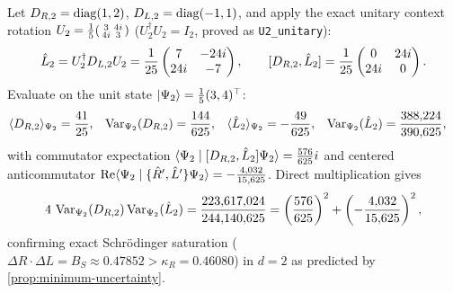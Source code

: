 \begin{example}
\label{ex:uncertainty-2x2}
Let $D_{R,2} = \diag(1, 2)$, $D_{L,2} = \diag(-1, 1)$, and apply the exact unitary context
rotation $U_2 = \frac{1}{5}\begin{psmallmatrix} 3 & 4i \\ 4i & 3 \end{psmallmatrix}$
($U_2^\dagger U_2 = I_2$, proved as \texttt{U2\_unitary}):
\begin{equation*}
  \opL_2 = U_2^\dagger D_{L,2} U_2 =
  \frac{1}{25}\begin{pmatrix} 7 & -24i \\ 24i & -7 \end{pmatrix},
  \qquad
  \comm{D_{R,2}}{\opL_2} =
  \frac{1}{25}\begin{pmatrix} 0 & 24i \\ 24i & 0 \end{pmatrix}.
\end{equation*}
Evaluate on the unit state $\ket{\Psi_2} = \frac{1}{5}(3, 4)^\top$:
\begin{align*}
  \expect{D_{R,2}}{\Psi_2} &= \frac{41}{25}, &
  \var{D_{R,2}}{\Psi_2} &= \frac{144}{625}, &
  \expect{\opL_2}{\Psi_2} &= -\frac{49}{625}, &
  \var{\opL_2}{\Psi_2} &= \frac{388{,}224}{390{,}625},
\end{align*}
with commutator expectation $\braket{\Psi_2}{\comm{D_{R,2}}{\opL_2}\Psi_2} = \frac{576}{625}i$
and centered anticommutator $\RePart\braket{\Psi_2}{\{\opR',\opL'\}\Psi_2} = -\frac{4{,}032}{15{,}625}$.
Direct multiplication gives
\begin{equation*}
  4\,\var{D_{R,2}}{\Psi_2}\var{\opL_2}{\Psi_2}
  = \frac{223{,}617{,}024}{244{,}140{,}625}
  = \left(\frac{576}{625}\right)^2 + \left(-\frac{4{,}032}{15{,}625}\right)^2,
\end{equation*}
confirming exact Schr\"odinger saturation ($\Delta R \cdot \Delta L = B_S \approx 0.47852 > \kappa_R = 0.46080$)
in $d = 2$ as predicted by \cref{prop:minimum-uncertainty}.
\end{example}

